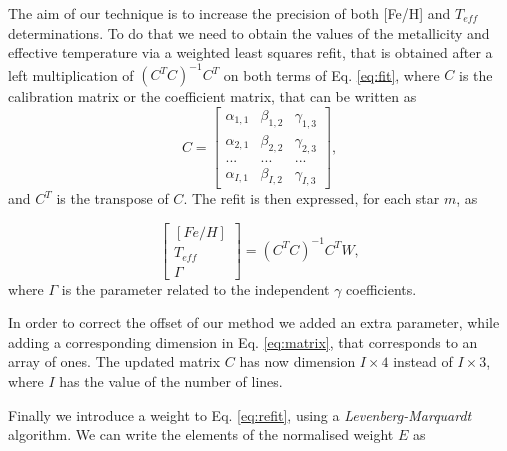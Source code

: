 \documentclass[referee]{aa}
\newcommand\T{\rule{0pt}{2.6ex}}
\begin{document}
The aim of our technique is to increase the precision of both [Fe/H] and $T_{eff}$ determinations. To do that we need to obtain the values of the metallicity and effective temperature via a weighted least squares refit, that is obtained after a left multiplication of $(C^{T}C)^{-1}C^{T}$ on both terms of Eq. \ref{eq:fit}, where $C$ is the calibration matrix or the coefficient matrix, that can be written as
\begin{equation}
\label{eq:matrix}
C = \left[\begin{array}{ccc} \alpha_{1,1} & \beta_{1,2} & \gamma_{1,3} \\ \alpha_{2,1} & \beta_{2,2} & \gamma_{2,3} \\... & ... & ...\\ \alpha_{I,1} & \beta_{I,2} & \gamma_{I,3} \end{array}\right],
\end{equation}
and $C^{T}$ is the transpose of $C$. The refit is then expressed, for each star $m$, as

\begin{equation}
\label{eq:refit}
\left[\begin{array}{c} [Fe/H] \\T_{eff} \\ \Gamma \end{array}\right] =  (C^{T}C)^{-1}C^{T}W,
\end{equation}
where $\Gamma$ is the parameter related to the independent  $\gamma$ coefficients.

In order to correct the offset of our method we added an extra parameter, while adding a corresponding dimension in Eq. \ref{eq:matrix}, that corresponds to an array of ones. The updated matrix $C$ has now dimension $I \times 4$ instead of $I \times 3$, where $I$ has the value of the number of lines.



Finally we introduce a weight to Eq. \ref{eq:refit}, using a \textit{Levenberg-Marquardt} \citep[][]{Press-1992} algorithm. We can write the elements of the normalised weight $E$ as
\end{document}
